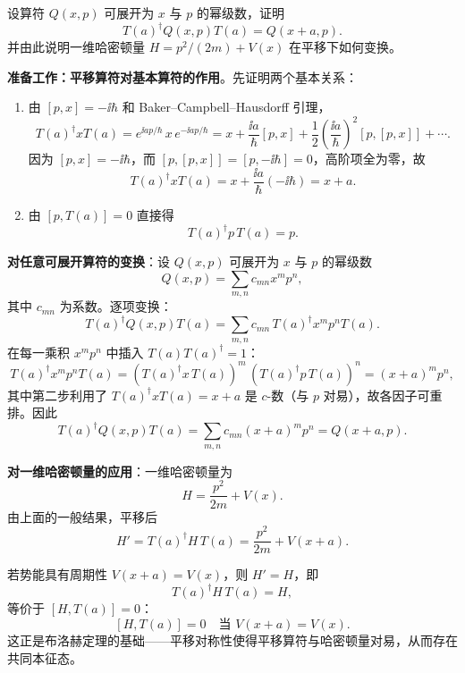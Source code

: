 \begin{question}
设算符 $Q(x,p)$ 可展开为 $x$ 与 $p$ 的幂级数，证明
\[
T(a)^\dagger Q(x,p)T(a)=Q(x+a,p).
\]
并由此说明一维哈密顿量 $H=p^2/(2m)+V(x)$ 在平移下如何变换。
\end{question}
\begin{solution}
	\textbf{准备工作：平移算符对基本算符的作用}。先证明两个基本关系：
	\begin{enumerate}
	\item 由 $[p,x]=-\ii\hbar$ 和 Baker--Campbell--Hausdorff 引理，
	\[
	T(a)^\dagger xT(a)=e^{\ii a p/\hbar}\,x\,e^{-\ii a p/\hbar}
	=x+\frac{\ii a}{\hbar}[p,x]+\frac12\left(\frac{\ii a}{\hbar}\right)^2[p,[p,x]]+\cdots.
	\]
	因为 $[p,x]=-\ii\hbar$，而 $[p,[p,x]]=[p,-\ii\hbar]=0$，高阶项全为零，故
	\[
	T(a)^\dagger xT(a)=x+\frac{\ii a}{\hbar}(-\ii\hbar)=x+a.
	\]
	\item 由 $[p,T(a)]=0$ 直接得
	\[
	T(a)^\dagger p\,T(a)=p.
	\]
	\end{enumerate}

	\textbf{对任意可展开算符的变换}：设 $Q(x,p)$ 可展开为 $x$ 与 $p$ 的幂级数
	\[
	Q(x,p)=\sum_{m,n}c_{mn}x^mp^n,
	\]
	其中 $c_{mn}$ 为系数。逐项变换：
	\[
	T(a)^\dagger Q(x,p)T(a)=\sum_{m,n}c_{mn}\,T(a)^\dagger x^m p^n T(a).
	\]
	在每一乘积 $x^m p^n$ 中插入 $T(a)T(a)^\dagger=1$：
	\[
	T(a)^\dagger x^m p^n T(a)=(T(a)^\dagger x\,T(a))^m\,(T(a)^\dagger p\,T(a))^n=(x+a)^m p^n,
	\]
	其中第二步利用了 $T(a)^\dagger x T(a)=x+a$ 是 $c$-数（与 $p$ 对易），故各因子可重排。因此
	\[
	T(a)^\dagger Q(x,p)T(a)=\sum_{m,n}c_{mn}(x+a)^mp^n=Q(x+a,p).
	\]

	\textbf{对一维哈密顿量的应用}：一维哈密顿量为
	\[
	H=\frac{p^2}{2m}+V(x).
	\]
	由上面的一般结果，平移后
	\[
	H'=T(a)^\dagger H\,T(a)=\frac{p^2}{2m}+V(x+a).
	\]

	若势能具有周期性 $V(x+a)=V(x)$，则 $H'=H$，即
	\[
	T(a)^\dagger H\,T(a)=H,
	\]
	等价于 $[H,T(a)]=0$：
	\[
	\boxed{[H,T(a)]=0\quad\text{当 }V(x+a)=V(x)}.
	\]
	这正是布洛赫定理的基础——平移对称性使得平移算符与哈密顿量对易，从而存在共同本征态。
	\end{solution}

